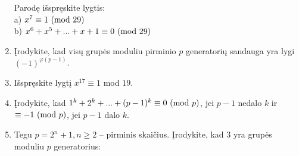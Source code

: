 \begin{enumerate}
    Parodę išspręskite lygtis: \\
      a) $x^7 \equiv 1 \ (\text{mod } 29)$\\
      b) $x^6 + x^5 + ... + x + 1 \equiv 0 \ (\text{mod } 29)$
  \item Įrodykite, kad visų grupės moduliu pirminio $p$ generatorių
    sandauga yra lygi $(-1)^{\varphi(p-1)}$.
  \item Išspręskite lygtį $x^{17} \equiv 1$ mod $19$. 
  \item Įrodykite, kad $1^k + 2^k + ... + (p-1)^k \equiv 0 \ (\text{mod } p)$, jei
    $p-1$ nedalo $k$ ir $\equiv - 1 \ (\text{mod } p)$, jei $p-1$ dalo $k$.
  \item Tegu $p = 2^n + 1, n \geq 2$ -- pirminis skaičius. Įrodykite, kad $3$ yra grupės
    moduliu $p$ generatorius: \\

\end{enumerate}
